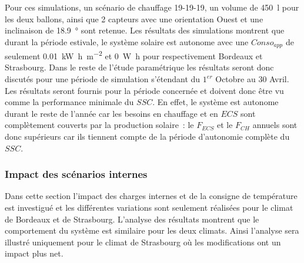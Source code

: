 Pour ces simulations, un scénario de chauffage 19-19-19, un volume de \SI{450}{\litre}
pour les deux ballons, ainsi que \num{2} capteurs avec une orientation Ouest et une
inclinaison de \SI{18.9}{\degree} sont retenue. Les résultats des simulations montrent
que durant la période estivale, le système solaire est autonome avec une $Conso_{app}$ de
seulement \SI[per-mode=symbol]{0.01}{\kilo\watt\hour\per\metre\squared} et \SI{0}{\watt\hour}
pour respectivement Bordeaux et Strasbourg.
Dans le reste de l’étude paramétrique les résultats seront donc discutés pour une période
de simulation s’étendant du $1^{er}$ Octobre au $30$ Avril. Les résultats seront fournis
pour la période concernée et doivent donc être vu comme la performance minimale du $SSC$.
En effet, le système est autonome durant le reste de l’année car les besoins en chauffage
et en $ECS$ sont complètement couverts par la production solaire~: le $F_{ECS}$ et le
$F_{CH}$ annuels sont donc supérieurs car ils tiennent compte de la période d’autonomie
complète du $SSC$.




\subsubsection{Impact des scénarios internes} %
\label{ssub:impact_des_scenarios_internes}
Dans cette section l’impact des charges internes et de la consigne de température est
investigué et les différentes variations sont seulement réalisées pour le climat
de Bordeaux et de Strasbourg. L’analyse des résultats montrent que le comportement
du système est similaire pour les deux climats. Ainsi l’analyse sera illustré
uniquement pour le climat de Strasbourg où les modifications ont un impact plus net.

